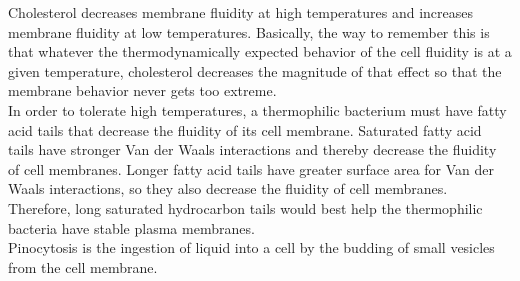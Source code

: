 \documentclass{article}
\theoremstyle{plain}%
\theoremstyle{definition}
\theoremstyle{remark}
\begin{document}
\indent Cholesterol decreases membrane fluidity at high temperatures and increases membrane fluidity at low temperatures. Basically, the way to remember this is that whatever the thermodynamically expected behavior of the cell fluidity is at a given temperature, cholesterol decreases the magnitude of that effect so that the membrane behavior never gets too extreme.\\
\indent In order to tolerate high temperatures, a thermophilic bacterium must have fatty acid tails that decrease the fluidity of its cell membrane. Saturated fatty acid tails have stronger Van der Waals interactions and thereby decrease the fluidity of cell membranes. Longer fatty acid tails have greater surface area for Van der Waals interactions, so they also decrease the fluidity of cell membranes. Therefore, long saturated hydrocarbon tails would best help the thermophilic bacteria have stable plasma membranes.\\
\indent Pinocytosis is the ingestion of liquid into a cell by the budding of small vesicles from the cell membrane.
\end{document}
